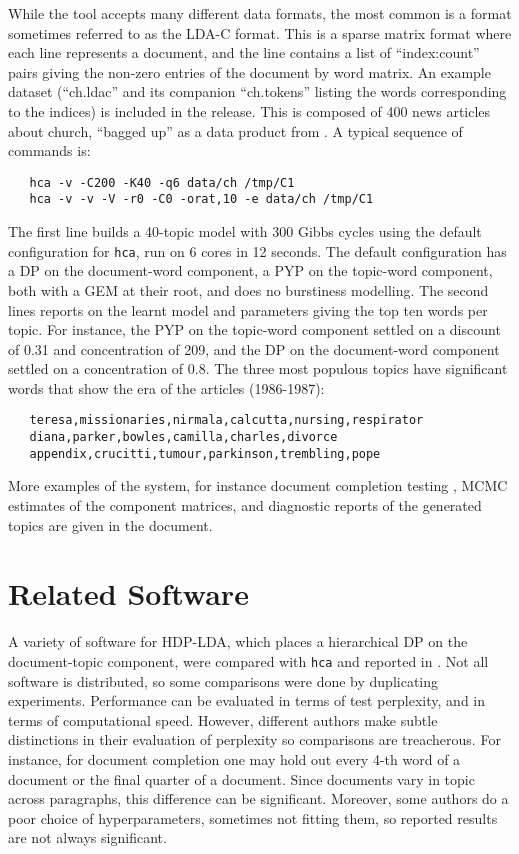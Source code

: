 \documentclass[twoside,11pt]{article}
\begin{document}
While the tool accepts many different data formats, the
most common is a format sometimes referred to as the LDA-C format.
This is a sparse matrix format where each line represents a document,
and the line contains a list of ``index:count'' pairs giving the
non-zero entries of the document by word matrix.  An example dataset
(``ch.ldac'' and its companion ``ch.tokens'' listing the words
corresponding to the indices) is included in the release.
This is composed of 400 news articles about church, ``bagged up''
as a data product from \cite{Lewis:2004}.
A typical sequence of commands is:
\begin{verbatim}
   hca -v -C200 -K40 -q6 data/ch /tmp/C1
   hca -v -v -V -r0 -C0 -orat,10 -e data/ch /tmp/C1
\end{verbatim}
The first line builds a 40-topic model with 300 Gibbs cycles
using the default configuration
for {\tt hca}, run on 6 cores in 12 seconds.
The default configuration has a DP on the document-word component,
a PYP on the topic-word component,
both with a GEM at their root, and does no burstiness modelling.
The second lines reports on the learnt model and parameters
giving the top ten words per topic.
For instance, the PYP on the topic-word
component settled on a discount of 0.31 and concentration of 209,
and the DP on the document-word component settled on a concentration of 0.8.
The three most populous topics have significant words that show the
era of the articles (1986-1987):
\begin{verbatim}
   teresa,missionaries,nirmala,calcutta,nursing,respirator
   diana,parker,bowles,camilla,charles,divorce
   appendix,crucitti,tumour,parkinson,trembling,pope
\end{verbatim}
More examples of the system, for instance document completion
testing \cite{Buntine09},
MCMC estimates of the component matrices,
and diagnostic reports of the generated topics
are given in the document.


\section{Related Software}

A variety of software for HDP-LDA, which places a
hierarchical DP on the document-topic component,
were compared with {\tt hca} and reported in
\cite{buntinemishra14}.
Not all software is distributed, so some comparisons
were done by duplicating experiments.
Performance can be evaluated in terms of
test perplexity, and in terms of computational
speed.  However, different authors make subtle
distinctions in their evaluation of perplexity so
comparisons are treacherous.
For instance, for document completion one may
hold out every 4-th word of a document or the
final quarter of a document.  Since documents
vary in topic across paragraphs, this difference can be
significant.
Moreover, some authors do a poor choice of
hyperparameters, sometimes not fitting them,
so reported results are not always
significant.
\end{document}
